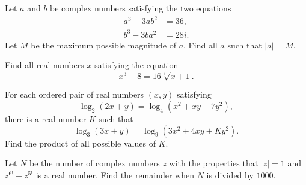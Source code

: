 \documentclass[11pt]{article}
\theoremstyle{definition}
\begin{document}
\begin{question}[name={2017 HMMT, November Guts, \href{https://artofproblemsolving.com/community/c129h1387210p7718352}{Problem 16}}]
	Let $a$ and $b$ be complex numbers satisfying the two equations
	\begin{align*}
		a^3 - 3ab^2 & = 36, \\
		b^3 - 3ba^2 & = 28i.
	\end{align*}Let $M$ be the maximum possible magnitude of $a$. Find all $a$ such that $|a| = M$.
\end{question}






\begin{question}[name={2017 HMMT, November Guts, \href{https://artofproblemsolving.com/community/c129h1387220p7718379}{Problem 25}}]
	Find all real numbers $x$ satisfying the equation $$x^3 - 8 = 16 \sqrt[3]{x + 1}.$$
\end{question}







\begin{question}[name={2018 AIME I, \href{https://artofproblemsolving.com/community/c4p9995689}{Problem 5}}]
	For each ordered pair of real numbers $(x,y)$ satisfying
	\[ \log_2(2x+y) = \log_4(x^2+xy+7y^2), \]there is a real number $K$ such that
	\[ \log_3(3x+y) = \log_9(3x^2+4xy+Ky^2). \]Find the product of all possible values of $K$.
\end{question}


%	













\begin{question}[name={2018 AIME I, \href{https://artofproblemsolving.com/community/c4p9995336}{Problem 6}}]
	Let $N$ be the number of complex numbers $z$ with the properties that $|z|=1$ and $z^{6!}-z^{5!}$ is a real number. Find the remainder when $N$ is divided by $1000$.
\end{question}


%	
\end{document}
